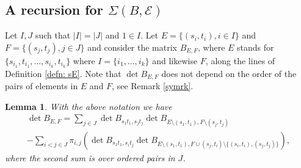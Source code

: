 \documentclass[10pt]{amsart}
\newcommand{\sE}{\mathcal{E}}
\theoremstyle{plain}
\newtheorem{lem}[thm]{Lemma}
\newcommand{\0}{\color{blue}{\mathsf{0}}}
\begin{document}
\subsection{A recursion  \texorpdfstring{for $\Sigma(B,\sE)$}{.}} 
Let $I,J$ such that $|I| = |J|$ and $1\in I$.
Let  $E=\{(s_i,t_i),i\in I\}$  and $F=\{(s_j,t_j),j\in J\}$ and consider the matrix
$B_{E,F}$, where $E$ stands for $\{s_{i_1},t_{i_1},\ldots , s_{i_k},t_{i_k}\}$ where $I=\{i_1,\ldots, i_k\}$ and likewise $F$, along the lines of 
Definition \ref{defn: sE}. Note that $\det B_{E,F}$ does not depend on the order of the pairs of elements in $E$ and $F$,
see Remark \ref{symrk}. 

\begin{lem}\label{expandlem} With the above notation we have
\begin{multline}\label{expandeq}
\det B_{E,F}=\sum_{j\in J}\det B_{s_1t_1,s_jt_j}\det B_{E\setminus(s_1,t_1),F\setminus (s_j,t_j)} \\
 -\sum_{i<j\in J}\pi_{i,j}\left( \det B_{s_1t_1,s_it_j}\det B_{E\setminus (s_1,t_1),F\cup (s_j,t_i)\setminus \{(s_i,t_i),(s_j,t_j)\}} \right),
\end{multline}
where the second sum is over ordered pairs in $J$.
\end{lem}
\end{document}
